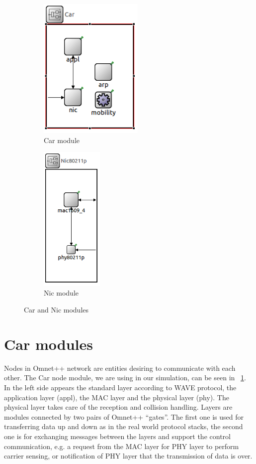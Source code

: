 \begin{figure}[bt]
 \centering
 \begin{subfigure}[b]{5cm}
 	\includegraphics[width=5cm]{img/CarNode}
 	\caption{Car module}
 	\label{fig:car}
 \end{subfigure}
 \begin{subfigure}[b]{5cm}
 	\includegraphics[width=3cm]{img/Nic80211p}
 	\caption{Nic module}%
 	\label{fig:nic}
 \end{subfigure}
 \caption{Car and Nic modules}
 \label{fig:car_nic}
\end{figure}

\section{Car modules}
Nodes in Omnet++ network are entities desiring to communicate with each other.
The Car node module, we are using in our simulation, can be seen in
~\ref{fig:car}. In the left side appears the standard layer according to WAVE
protocol, the application layer (appl), the MAC layer and the physical
layer (phy). The physical layer takes care of the reception and collision
handling. Layers are modules connected by two pairs of Omnet++ ``gates''. The
first one is used for transferring data up and down as in the real world
protocol stacks, the second one is for exchanging messages between the layers
and support the control communication, e.g. a request from the MAC layer for PHY
layer to perform carrier sensing, or notification of PHY layer that the
transmission of data is over.

